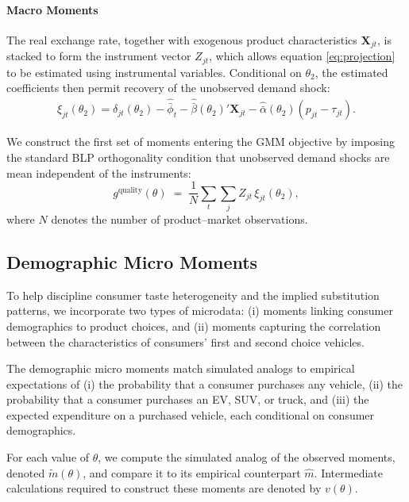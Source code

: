 \documentclass[11pt]{article}
\begin{document}
\paragraph{Macro Moments}
The real exchange rate, together with exogenous product characteristics \(\mathbf{X}_{jt}\), is stacked to form the instrument vector \(Z_{jt}\), which allows equation \eqref{eq:projection} to be estimated using instrumental variables. Conditional on \(\theta_2\), the estimated coefficients then permit recovery of the unobserved demand shock:
\begin{align*}
    \xi_{jt}(\theta_2)
    =
    \delta_{jt}(\theta_2)
    - \hat{\bar{\phi}}_t
    - \hat{\bar{\beta}}(\theta_2)'\mathbf{X}_{jt}
    - \hat{\bar{\alpha}}(\theta_2)(p_{jt} - \tau_{jt}).
\end{align*}

We construct the first set of moments entering the GMM objective by imposing the standard BLP orthogonality condition that unobserved demand shocks are mean independent of the instruments:
\begin{equation}
g^{\text{quality}}(\theta)
\;=\;
\frac{1}{N}
\sum_{t}
\sum_{j}
Z_{jt}\,\xi_{jt}(\theta_2),
\end{equation}
where \(N\) denotes the number of product–market observations.

\subsection{Demographic Micro Moments}

To help discipline consumer taste heterogeneity and the implied substitution patterns, we incorporate two types of microdata: (i) moments linking consumer demographics to product choices, and (ii) moments capturing the correlation between the characteristics of consumers' first and second choice vehicles.

The demographic micro moments match simulated analogs to empirical expectations of (i) the probability that a consumer purchases any vehicle, (ii) the probability that a consumer purchases an EV, SUV, or truck, and (iii) the expected expenditure on a purchased vehicle, each conditional on consumer demographics.

For each value of \(\theta\), we compute the simulated analog of the observed moments, denoted \(\tilde{m}(\theta)\), and compare it to its empirical counterpart \(\hat{m}\). Intermediate calculations required to construct these moments are denoted by \(v(\theta)\).
\end{document}
